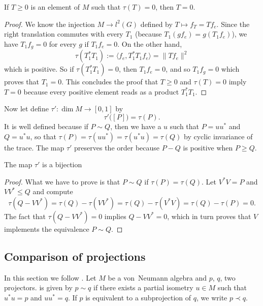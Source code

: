 \begin{proposition}
	If $T\geq 0$ is an element of $M$ such that $\tau(T)=0$, then $T=0$.
\end{proposition}

\begin{proof}
	We know the injection $M\to l^2(G)$ defined by $T\mapsto f_T=Tf_e$. Since the right translation commutes with every $T_1$ (because $T_1(gf_e)=g(T_1f_e)$), we have $T_1f_g=0$ for every $g$ if $T_1f_e=0$. On the other hand,
	\[
		\tau(T_1^*T_1):=\langle f_e, T_1^*T_1f_e\rangle =\| Tf_e \|^2
	\]
	which is positive. So if $\tau(T_1^*T_1)=0$, then $T_1f_e=0$, and so $T_1f_g=0$ which proves that $T_1=0$. This concludes the proof that $T\geq 0$ and $\tau(T)=0$ imply $T=0$ because every positive element reads as a product $T_1^*T_1$.
\end{proof}

Now let define $\tau'\colon \dim M\to [0,1]$ by
\begin{equation}
	\tau'\big( [P] \big)=\tau(P).
\end{equation}
It is well defined because if $P\sim Q$, then we have a $u$ such that $P=uu^*$ and $Q=u^*u$, so that $\tau(P)=\tau(uu^*)=\tau(u^*u)=\tau(Q)$ by cyclic invariance of the trace. The map $\tau'$ preserves the order because $P-Q$ is positive when $P\geq Q$.

\begin{proposition}
	The map $\tau'$ is a bijection
\end{proposition}

\begin{proof}
	What we have to prove is that $P\sim Q$ if $\tau(P)=\tau(Q)$. Let $V^*V=P$ and $VV^*\leq Q$ and compute
	\[
		\tau(Q-VV^*)=\tau(Q)-\tau(VV^*)=\tau(Q)-\tau(V^*V)=\tau(Q)-\tau(P)=0.
	\]
	The fact that $\tau(Q-VV^*)=0$ implies $Q-VV^*=0$, which in turn proves that $V$ implements the equivalence $P\sim Q$.
\end{proof}

\subsection{Comparison of projections}

In this section we follow \cite{Wassermann}. Let $M$ be a von~Neumann algebra and $p$, $q$, two projectors. \label{PgEaivVNMurray}  is given by $p\sim q$ if there exists a partial isometry $u\in M$ such that $u^*u=p$ and $uu^*=q$. If $p$ is equivalent to a subprojection of $q$, we write $p\prec q$.

